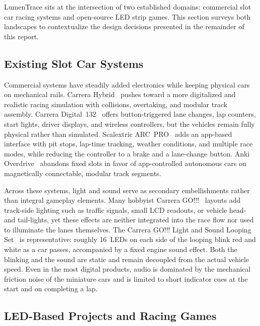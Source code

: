 \documentclass[10pt,journal,final,a4paper]{IEEEtran}
\begin{document}
LumenTrace sits at the intersection of two established domains: commercial slot car racing systems and open-source LED strip games. This section surveys both landscapes to contextualize the design decisions presented in the remainder of this report.

\subsection{Existing Slot Car Systems}
\label{subsec:existing-slot-car-systems}

Commercial systems have steadily added electronics while keeping physical cars on mechanical rails. Carrera Hybrid~\cite{carrera:2026hybrid} pushes toward a more digitalized and realistic racing simulation with collisions, overtaking, and modular track assembly. Carrera Digital~132~\cite{carrera:2026digital} offers button-triggered lane changes, lap counters, start lights, driver displays, and wireless controllers, but the vehicles remain fully physical rather than simulated. Scalextric ARC~PRO~\cite{scalextric:2026arc} adds an app-based interface with pit stops, lap-time tracking, weather conditions, and multiple race modes, while reducing the controller to a brake and a lane-change button. Anki Overdrive~\cite{anki:2026overdrive} abandons fixed slots in favor of app-controlled autonomous cars on magnetically connectable, modular track segments.

Across these systems, light and sound serve as secondary embellishments rather than integral gameplay elements. Many hobbyist Carrera GO!!!~\cite{carrera:2026carrera} layouts add track-side lighting such as traffic signals, small LCD readouts, or vehicle head- and tail-lights, yet these effects are neither integrated into the race flow nor used to illuminate the lanes themselves. The Carrera GO!!! Light and Sound Looping Set~\cite{carrera:2026light} is representative: roughly 16~LEDs on each side of the looping blink red and white as a car passes, accompanied by a fixed engine sound effect. Both the blinking and the sound are static and remain decoupled from the actual vehicle speed. Even in the most digital products, audio is dominated by the mechanical friction noise of the miniature cars and is limited to short indicator cues at the start and on completing a lap.

\subsection{LED-Based Projects and Racing Games}
\label{subsec:led-based-projects-and-racing-games}
\end{document}
